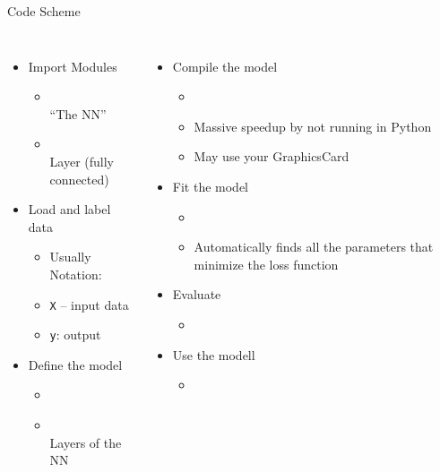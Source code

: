 
\begin{frame}{Code Scheme}
%
\begin{columns}[T]
	\begin{itemize}
	\item Import Modules
		\begin{itemize}
		\item {}\\
			\enquote{The NN}
		\item {}\\
			Layer (fully connected)
		\end{itemize}
	\item Load and label data
		\begin{itemize}
		\item Usually Notation:
		\item \texttt{X} -- input data
		\item \texttt{y}: output
		\end{itemize}
	\item Define the model
		\begin{itemize}
		\item {}
		\item {}\\
			Layers of the NN
		\end{itemize}
	\end{itemize}
%
	\begin{itemize}
	\item Compile the model
		\begin{itemize}
		\item {}
		\item Massive speedup by not running in Python
		\item May use your GraphicsCard
		\end{itemize}
	\item Fit the model
		\begin{itemize}
		\item {}
		\item Automatically finds all the parameters that minimize the loss function
		\end{itemize}
	\item Evaluate
		\begin{itemize}
		\item {}
		\end{itemize}
	\item Use the modell
		\begin{itemize}
		\item {}
		\end{itemize}
	\end{itemize}
\end{columns}
%
\end{frame}


